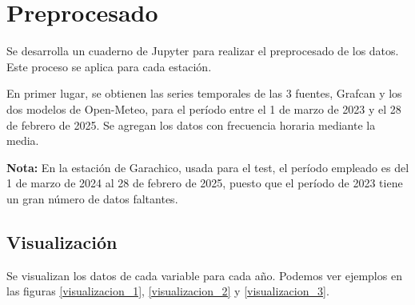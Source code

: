 \section{Preprocesado}

Se desarrolla un cuaderno de Jupyter para realizar el preprocesado de los datos. Este proceso se aplica para cada estación.

En primer lugar, se obtienen las series temporales de las 3 fuentes, Grafcan y los dos modelos de Open-Meteo, para el período entre el 1 de marzo de 2023 y el 28 de febrero de 2025.
Se agregan los datos con frecuencia horaria mediante la media. 

\textbf{Nota:} En la estación de Garachico, usada para el test, el período empleado es del 1 de marzo de 2024 al 28 de febrero de 2025, puesto que el período de 2023 tiene 
un gran número de datos faltantes.

\subsection{Visualización}
Se visualizan los datos de cada variable para cada año. Podemos ver ejemplos en las figuras \ref{visualizacion_1}, \ref{visualizacion_2} y \ref{visualizacion_3}.

